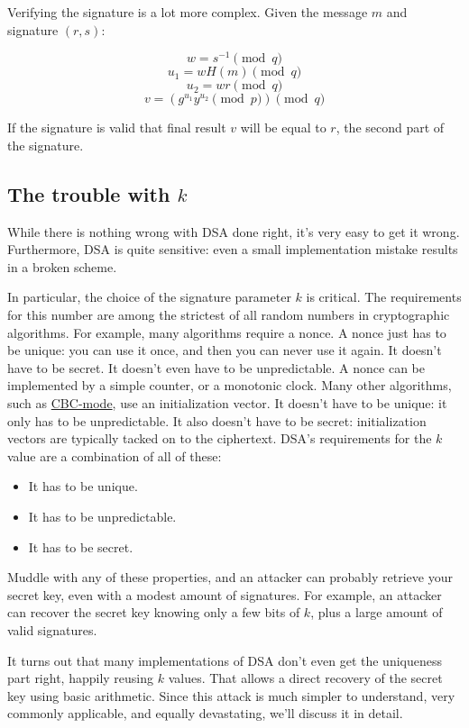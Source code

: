 \documentclass[11pt,ebook,table,dvipsnames]{memoir}
\begin{document}
Verifying the signature is a lot more complex. Given the message $m$
and signature $(r, s)$:

\[
w = s^{-1} \pmod q
\]
\[
u_1 = wH(m) \pmod q
\]
\[
u_2 = wr \pmod q
\]
\[
v = (g^{u_1}y^{u_2} \pmod p) \pmod q
\]

If the signature is valid that final result $v$ will be equal to $r$,
the second part of the signature.
\subsection{The trouble with $k$}
\label{sec-2-8-3-4}

While there is nothing wrong with DSA done right, it's very easy to
get it wrong. Furthermore, DSA is quite sensitive: even a small
implementation mistake results in a broken scheme.

In particular, the choice of the signature parameter $k$ is critical.
The requirements for this number are among the strictest of all random
numbers in cryptographic algorithms. For example, many algorithms
require a \gls{nonce}. A nonce just has to be unique: you can use it
once, and then you can never use it again. It doesn't have to be
secret. It doesn't even have to be unpredictable. A nonce can be
implemented by a simple counter, or a monotonic clock. Many other
algorithms, such as \hyperref[CBC mode]{CBC-mode}, use an initialization vector. It doesn't
have to be unique: it only has to be unpredictable. It also doesn't
have to be secret: initialization vectors are typically tacked on to
the ciphertext. DSA's requirements for the $k$ value are a combination
of all of these:

\begin{itemize}
\item It has to be unique.
\item It has to be unpredictable.
\item It has to be secret.
\end{itemize}

Muddle with any of these properties, and an attacker can probably
retrieve your secret key, even with a modest amount of signatures. For
example, an attacker can recover the secret key knowing only a
few bits of $k$, plus a large amount of valid signatures.
\cite{nguyen:dsa}

It turns out that many implementations of DSA don't even get the
uniqueness part right, happily reusing $k$ values. That allows a
direct recovery of the secret key using basic arithmetic. Since this
attack is much simpler to understand, very commonly applicable, and
equally devastating, we'll discuss it in detail.
\end{document}
